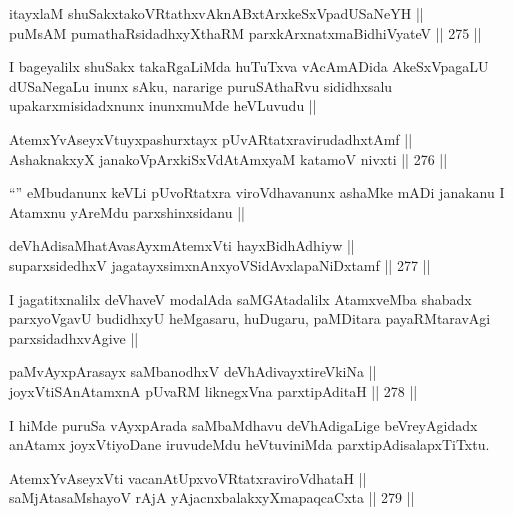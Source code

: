 \begin{shl}
itayxlaM shuSakxtakoVRtathxvAknABxtArxkeSxVpadUSaNeYH || \\
puMsAM pumathaRsidadhxyXthaRM parxkArxnatxmaBidhiVyateV ||  275 ||  
\end{shl}

\begin{artha}
I bageyalilx shuSakx takaRgaLiMda huTuTxva vAcAmADida AkeSxVpagaLU dUSaNegaLu inunx sAku, nararige puruSAthaRvu sididhxsalu upakarxmisidadxnunx inunxmuMde heVLuvudu ||
\end{artha}

\begin{shl}
AtemxYvAseyxVtuyxpashurxtayx pUvARtatxravirudadhxtAmf || \\
AshaknakxyX janakoV\s pArxkiSxVdAtAmx\s yaM katamoV nivxti ||  276 ||  
\end{shl}

\begin{artha}
``\stext'' eMbudanunx keVLi pUvoRtatxra viroVdhavanunx ashaMke mADi janakanu I Atamxnu yAreMdu parxshinxsidanu ||
\end{artha}

\begin{shl}
deVhAdisaMhatAvasAyxmAtemxVti hayxBidhAdhiyw || \\
suparxsidedhxV jagatayxsimxnAnxyoVSidAvxlapaNiDxtamf ||  277 || 
\end{shl}

\begin{artha}
I jagatitxnalilx deVhaveV modalAda saMGAtadalilx AtamxveMba shabadx parxyoVgavU budidhxyU heMgasaru, huDugaru, paMDitara payaRMtaravAgi parxsidadhxvAgive ||
\end{artha}


\begin{shl}
paMvAyxpArasayx saMbanodhxV deVhAdivayxtireVkiNa ||  \\
joyxVtiSA\s nAtamxnA pUvaRM liknegxVna parxtipAditaH ||  278 || 
\end{shl}

\begin{artha}
I hiMde puruSa vAyxpArada saMbaMdhavu deVhAdigaLige beVreyAgidadx anAtamx joyxVtiyoDane iruvudeMdu  heVtuviniMda parxtipAdisalapxTiTxtu.
\end{artha}

\begin{shl}
AtemxYvAseyxVti vacanAtUpxvoVRtatxraviroVdhataH || \\
saMjAtasaMshayoV rAjA yAjacnxbalakxyXmapaqcaCxta ||  279 ||  
\end{shl}

